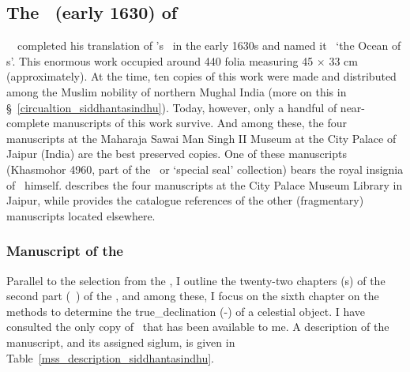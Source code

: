 \subsection{The \Siddhantasindhu\ (\circa early 1630) of \Nityananda}\label{siddhantasindhu_nityananda} 

\Pandita\ \Nityanandafull\ completed his translation of \MullaFarid's \ZijiShahJahani\ in the early 1630s and named it \Siddhantasindhu\ `the Ocean of \Siddhanta s'. This enormous work occupied around 440 folia measuring 45 $\times$ 33 cm (approximately). At the time, ten copies of this work were made and distributed among the Muslim nobility of northern Mughal India (more on this in \S~\ref{circualtion_siddhantasindhu}). Today, however, only a handful of near-complete manuscripts of this work survive. And among these, the four manuscripts at the Maharaja Sawai Man Singh II Museum at the City Palace of Jaipur (India) are the best preserved copies. One of these manuscripts (Khasmohor 4960, part of the \khasmohor\ or `special seal' collection) bears the royal insignia of \Shahjahan\ himself. \textcite[138--143]{PingreeJaipur} describes the four manuscripts at the City Palace Museum Library in Jaipur, while \textcites[p.\thinspace 173b in Volume A3 and p.\thinspace 184a in Volume A5]{PingreeCESS} provides the catalogue references of the other (fragmentary) manuscripts located elsewhere.

\subsubsection{Manuscript of the \Siddhantasindhu} \label{manuscript_siddhantasindhu} 
Parallel to the selection from the \ZijiShahJahani, I outline the twenty-two chapters (\adhyaya s) of the second part (\dvitiya\ \kanda) of the \Siddhantasindhu, and among these, I focus on the sixth chapter on the methods to determine the \gls{true_declination} (\spasta-\kranti) of a celestial object. I have consulted the only copy of \Siddhantasindhu\ that has been available to me. A description of the manuscript, and its assigned siglum, is given in Table~\ref{mss_description_siddhantasindhu}.

